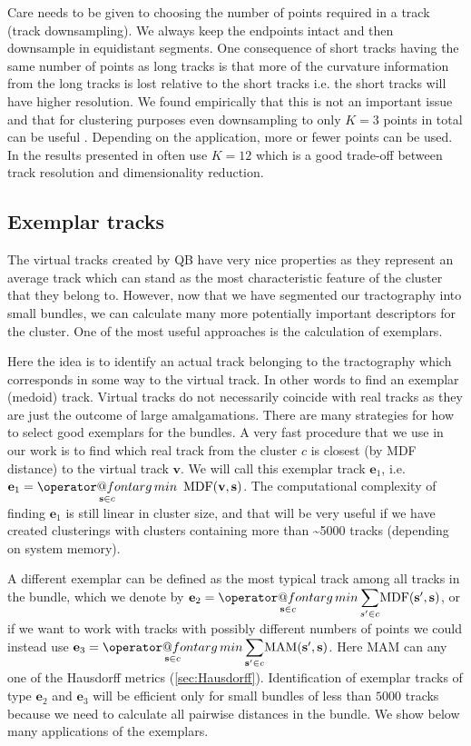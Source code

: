 \documentclass{bioinfo}
\makeatletter
\def\argmin{\mathop{\operator@font arg\,min}}
\makeatother
\begin{document}
\begin{methods}
Care needs to be given to choosing the number of points required in a
track (track downsampling). We always keep the endpoints intact and then
downsample in equidistant segments. One consequence of short tracks
having the same number of points as long tracks is that more of the
curvature information from the long tracks is lost relative to the short
tracks i.e. the short tracks will have higher resolution.  We found
empirically that this is not an important issue and that for clustering
purposes even downsampling to only $K=3$ points in total can be useful
\cite{EGMB10}. Depending on the application, more or fewer points can
be used. In the results presented in often use $K=12$ which is a good trade-off 
between track resolution and dimensionality reduction.


\subsection{Exemplar tracks\label{sub:exemplars}}

The virtual tracks created by QB have very nice properties as they
represent an average track which can stand as the most characteristic
feature of the cluster that they belong to. However, now that we have
segmented our tractography into small bundles, we can calculate many more
potentially important descriptors for the cluster. One of the most
useful approaches is the calculation of exemplars.

Here the idea is to identify an actual track belonging to the
tractography which corresponds in some way to the virtual track. In
other words to find an exemplar (medoid) track. Virtual tracks do not
necessarily coincide with real tracks as they are just the outcome of
large amalgamations. There are many strategies for how to select good
exemplars for the bundles. A very fast procedure that we use in our
work is to find which real track from the cluster $c$ is closest (by MDF
distance) to the virtual track $\mathbf{v}$. We will call this exemplar track $\mathbf{e}_{1}$,
i.e.~$\mathbf{e}_{1}={\displaystyle \argmin_{\mathbf{s} \in c}}\textrm{\,\ MDF}(\mathbf{v},\mathbf{s})$.
The computational complexity of finding $\mathbf{e}_{1}$ is still linear in
cluster size, and that will be very useful if we have created
clusterings with clusters containing more than \textasciitilde5000 tracks
(depending on system memory).

A different exemplar can be defined as the most typical track among all
tracks in the bundle, which we denote by $\mathbf{e}_{2}={\displaystyle
  \argmin_{\mathbf{s} \in c}}\,{\displaystyle \sum_{s'\in c}}\mathrm{MDF}(\mathbf{s'},\mathbf{s})$, or
if we want to work with tracks with possibly different numbers of points
we could instead use $\mathbf{e}_{3}={\displaystyle \argmin_{\mathbf{s} \in
    c}}\,{\displaystyle \sum_{\mathbf{s'}\in c}}\mathrm{MAM}(\mathbf{s'},\mathbf{s})$.
Here $\mathrm{MAM}$ can any one of the Hausdorff metrics (\ref{sec:Hausdorff}).
Identification of exemplar tracks of type $\mathbf{e}_{2}$ and $\mathbf{e}_{3}$ will be
efficient only for small bundles of less than $5000$ tracks because we
need to calculate all pairwise distances in the bundle. We show below
many applications of the exemplars. 


\end{methods}
\end{document}
